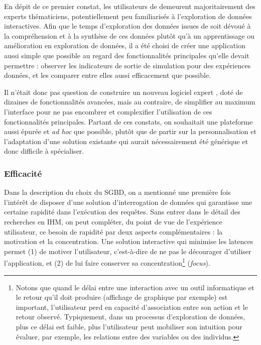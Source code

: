 En dépit de ce premier constat, les utilisateurs de \simedb{} demeurent majoritairement des experts thématiciens, potentiellement peu familiarisés à l'exploration de données interactives.
Afin que le temps d'exploration des données issues de \simfeodal{} soit dévoué à la compréhension et à la synthèse de ces données plutôt qu'à un apprentissage ou amélioration en exploration de données, il a été choisi de créer une application aussi simple que possible au regard des fonctionnalités principales qu'elle devait permettre : observer les indicateurs de sortie de simulation pour des expériences données, et les comparer entre elles aussi efficacement que possible.

Il n'était donc pas question de construire un nouveau \og logiciel expert \fg{}, doté de dizaines de fonctionnalités avancées, mais au contraire, de simplifier au maximum l'interface pour ne pas encombrer et complexifier l'utilisation de ces fonctionnalités principales.
Partant de ces constats, on souhaitait une plateforme aussi épurée et \textit{ad hoc} que possible, plutôt que de partir sur la personnalisation et l'adaptation d'une solution existante qui aurait nécessairement été générique et donc difficile à spécialiser.


\subsubsection{Efficacité}

Dans la description du choix du SGBD, on a mentionné une première fois l'intérêt de disposer d'une solution d'interrogation de données qui garantisse une certaine rapidité dans l'exécution des requêtes.
Sans entrer dans le détail des recherches en IHM, on peut compléter, du point de vue de l'expérience utilisateur, ce besoin de rapidité par deux aspects complémentaires : la motivation et la concentration.
Une solution interactive qui minimise les latences permet (1) de motiver l'utilisateur, c'est-à-dire de ne pas le décourager d'utiliser l'application, et (2) de lui faire conserver sa concentration\footnote{
	Notons que quand le délai entre une interaction avec un outil informatique et le retour qu'il doit produire (affichage de graphique par exemple) est important, l'utilisateur perd en capacité d'association entre son action et le retour observé.
	Typiquement, dans un processus d'exploration de données, plus ce délai est faible, plus l'utilisateur peut mobiliser son intuition pour évaluer, par exemple, les relations entre des variables ou des individus.
} (\textit{focus}).

